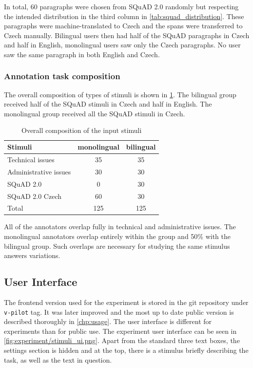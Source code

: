 In total, 60 paragraphs were chosen from SQuAD 2.0 randomly but respecting the intended distribution in the third column in \cref{tab:squad_distribution}. These paragraphs were machine-translated to Czech and the spans were transferred to Czech manually. Bilingual users then had half of the SQuAD paragraphs in Czech and half in English, monolingual users saw only the Czech paragraphs. No user saw the same paragraph in both English and Czech.

\subsubsection{Annotation task composition}

The overall composition of types of stimuli is shown in \cref{tab:stimuli_composition}. The bilingual group received half of the SQuAD stimuli in Czech and half in English. The monolingual group received all the SQuAD stimuli in Czech.

\begin{table}[H]
    \centering
        \begin{tabular}{| l | c c |}
            \hline 
            Stimuli & monolingual & bilingual \\
            \hline
            Technical issues & 35 & 35 \\
            Administrative issues & 30 & 30 \\
            SQuAD 2.0 & 0 & 30 \\
            SQuAD 2.0 Czech & 60 & 30 \\
            \hline
            Total & 125 & 125 \\
            \hline
        \end{tabular}
    \caption{\label{tab:stimuli_composition} Overall composition of the input stimuli}
\end{table}

All of the annotators overlap fully in technical and administrative issues. The monolingual annotators overlap entirely within the group and 50\% with the bilingual group. Such overlaps are necessary for studying the same stimulus answers variations.

\subsection{User Interface}

The \ptakopet{} frontend version used for the experiment is stored in the git repository under \texttt{v-pilot} tag. It was later improved and the most up to date public version is described thoroughly in \cref{chp:usage}. The user interface is different for experiments than for public use. The experiment user interface can be seen in \autoref{fig:experiment/stimuli_ui.png}. Apart from the standard three text boxes, the settings section is hidden and at the top, there is a stimulus briefly describing the task, as well as the text in question.

